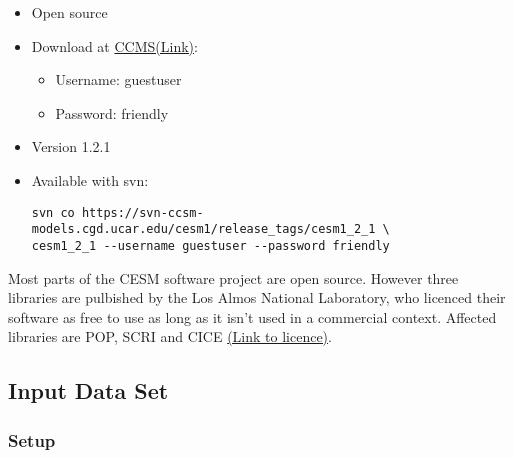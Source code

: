 \documentclass[]{article}
\providecommand{\tightlist}{%
  \setlength{\itemsep}{0pt}\setlength{\parskip}{0pt}}
\begin{document}
\begin{itemize}
\item
  Open source
\item
  Download at
  \href{http://www.cesm.ucar.edu/models/cesm1.2/cesm/doc/usersguide/x290.html\#download_ccsm_code}{CCMS(Link)}:

  \begin{itemize}
  \tightlist
  \item
    Username: guestuser
  \item
    Password: friendly
  \end{itemize}
\item
  Version 1.2.1
\item
  Available with svn:

\begin{verbatim}
svn co https://svn-ccsm-models.cgd.ucar.edu/cesm1/release_tags/cesm1_2_1 \
cesm1_2_1 --username guestuser --password friendly
\end{verbatim}
\end{itemize}

Most parts of the CESM software project are open source. However three
libraries are pulbished by the Los Almos National Laboratory, who
licenced their software as free to use as long as it isn't used in a
commercial context. Affected libraries are POP, SCRI and CICE
\href{http://www.cesm.ucar.edu/management/UofCAcopyright.ccsm3.html}{(Link
to licence)}.

\subsection{Input Data Set}\label{input-data-set}

\subsubsection{Setup}\label{setup}
\end{document}
